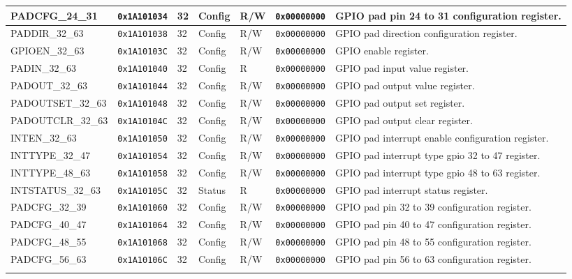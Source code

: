 {\begin{tabularx}{\textwidth}{|l|l|l|l|l|l|X|}
  \hline
  PADCFG\_24\_31 & \texttt{0x1A101034} & 32 & Config & R/W & \texttt{0x00000000} & GPIO pad pin 24 to 31 configuration register.\\
  \hline
  PADDIR\_32\_63 & \texttt{0x1A101038} & 32 & Config & R/W & \texttt{0x00000000} & GPIO pad direction configuration register.\\
  \hline
  GPIOEN\_32\_63 & \texttt{0x1A10103C} & 32 & Config & R/W & \texttt{0x00000000} & GPIO enable register.\\
  \hline
  PADIN\_32\_63 & \texttt{0x1A101040} & 32 & Config & R & \texttt{0x00000000} & GPIO pad input value register.\\
  \hline
  PADOUT\_32\_63 & \texttt{0x1A101044} & 32 & Config & R/W & \texttt{0x00000000} & GPIO pad output value register.\\
  \hline
  PADOUTSET\_32\_63 & \texttt{0x1A101048} & 32 & Config & R/W & \texttt{0x00000000} & GPIO pad output set register.\\
  \hline
  PADOUTCLR\_32\_63 & \texttt{0x1A10104C} & 32 & Config & R/W & \texttt{0x00000000} & GPIO pad output clear register.\\
  \hline
  INTEN\_32\_63 & \texttt{0x1A101050} & 32 & Config & R/W & \texttt{0x00000000} & GPIO pad interrupt enable configuration register.\\
  \hline
  INTTYPE\_32\_47 & \texttt{0x1A101054} & 32 & Config & R/W & \texttt{0x00000000} & GPIO pad interrupt type gpio 32 to 47 register.\\
  \hline
  INTTYPE\_48\_63 & \texttt{0x1A101058} & 32 & Config & R/W & \texttt{0x00000000} & GPIO pad interrupt type gpio 48 to 63 register.\\
  \hline
  INTSTATUS\_32\_63 & \texttt{0x1A10105C} & 32 & Status & R & \texttt{0x00000000} & GPIO pad interrupt status register.\\
  \hline
  PADCFG\_32\_39 & \texttt{0x1A101060} & 32 & Config & R/W & \texttt{0x00000000} & GPIO pad pin 32 to 39 configuration register.\\
  \hline
  PADCFG\_40\_47 & \texttt{0x1A101064} & 32 & Config & R/W & \texttt{0x00000000} & GPIO pad pin 40 to 47 configuration register.\\
  \hline
  PADCFG\_48\_55 & \texttt{0x1A101068} & 32 & Config & R/W & \texttt{0x00000000} & GPIO pad pin 48 to 55 configuration register.\\
  \hline
  PADCFG\_56\_63 & \texttt{0x1A10106C} & 32 & Config & R/W & \texttt{0x00000000} & GPIO pad pin 56 to 63 configuration register.\\
  \hline
  \caption{APB GPIO}
\end{tabularx}
}


